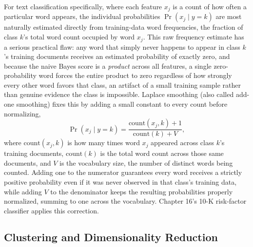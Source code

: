 \documentclass[../ai_in_finance]{subfiles}
\begin{document}
For text classification specifically, where each feature $x_j$ is a count of how often a particular word appears, the individual probabilities $\Pr(x_j \mid y=k)$ are most naturally estimated directly from training-data word frequencies, the fraction of class $k$'s total word count occupied by word $x_j$. This raw frequency estimate has a serious practical flaw: any word that simply never happens to appear in class $k$'s training documents receives an estimated probability of exactly zero, and because the naive Bayes score is a \emph{product} across all features, a single zero-probability word forces the entire product to zero regardless of how strongly every other word favors that class, an artifact of a small training sample rather than genuine evidence the class is impossible. Laplace smoothing (also called add-one smoothing) fixes this by adding a small constant to every count before normalizing,
\begin{equation*}
\Pr(x_j \mid y=k) = \frac{\text{count}(x_j, k) + 1}{\text{count}(k) + V},
\end{equation*}
where $\text{count}(x_j,k)$ is how many times word $x_j$ appeared across class $k$'s training documents, $\text{count}(k)$ is the total word count across those same documents, and $V$ is the vocabulary size, the number of distinct words being counted. Adding one to the numerator guarantees every word receives a strictly positive probability even if it was never observed in that class's training data, while adding $V$ to the denominator keeps the resulting probabilities properly normalized, summing to one across the vocabulary. Chapter 16's 10-K risk-factor classifier applies this correction.

\subsection{Clustering and Dimensionality Reduction}
\end{document}

